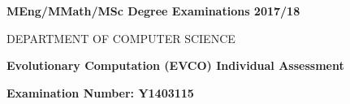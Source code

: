 \documentclass[12pt,a4paper]{article}
\begin{document}
	
	\begin{titlepage}
		\begin{center}
		\textbf{MEng/MMath/MSc Degree Examinations 2017/18}
		
	
		
		\textsc{DEPARTMENT OF COMPUTER SCIENCE}
		
		\vspace{3cm}
		
		\Large
		\textbf{Evolutionary Computation (EVCO)
		Individual Assessment}
	
		\vspace{1.5cm}
		
		\large
		\textbf{Examination Number: Y1403115}
		\end{center}
	\end{titlepage}
	
\end{document}
